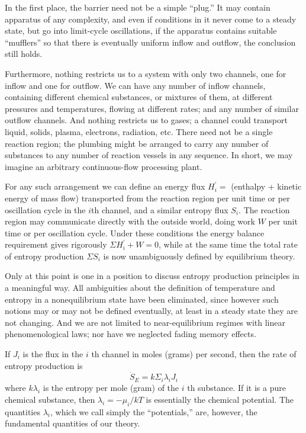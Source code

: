 \documentclass{article}
\begin{document}
In the first place, the barrier need not be a simple ``plug.'' It may contain apparatus of any complexity, and even if conditions in it never come to a steady state, but go into limit-cycle oscillations, if the apparatus contains suitable ``mufflers'' so that there is eventually uniform inflow and outflow, the conclusion still holds.

Furthermore, nothing restricts us to a system with only two channels, one for inflow and one for outflow. We can have any number of inflow channels, containing different chemical substances, or mixtures of them, at different pressures and temperatures, flowing at different rates; and any number of similar outflow channels. And nothing restricts us to gases; a channel could transport liquid, solids, plasma, electrons, radiation, etc. There need not be a single reaction region; the plumbing might be arranged to carry any number of substances to any number of reaction vessels in any sequence. In short, we may imagine an arbitrary continuous-flow processing plant.

For any such arrangement we can define an energy flux $H_i^{\prime}=$ (enthalpy + kinetic energy of mass flow) transported from the reaction region per unit time or per oscillation cycle in the $i$th channel, and a similar entropy flux $S_i$. The reaction region may communicate directly with the outside world, doing work $W$ per unit time or per oscillation cycle. Under these conditions the energy balance requirement gives rigorously $\Sigma H_i^{\prime}+W=0$, while at the same time the total rate of entropy production $\Sigma S_i$ is now unambiguously defined by equilibrium theory.

Only at this point is one in a position to discuss entropy production principles in a meaningful way. All ambiguities about the definition of temperature and entropy in a nonequilibrium state have been eliminated, since however such notions may or may not be defined eventually, at least in a steady state they are not changing. And we are not limited to near-equilibrium regimes with linear phenomenological laws; nor have we neglected fading memory effects.

If $J_i$ is the flux in the $i$ th channel in moles (grams) per second, then the rate of entropy production is
\begin{equation}
\dot{S}_E=k \Sigma_i \lambda_i J_i \label{eq-entropy-production}
\end{equation}
where $k \lambda_i$ is the entropy per mole (gram) of the $i$ th substance. If it is a pure chemical substance, then $\lambda_i=-\mu_i / k T$ is essentially the chemical potential. The quantities $\lambda_i$, which we call simply the ``potentials,'' are, however, the fundamental quantities of our theory.
\end{document}

